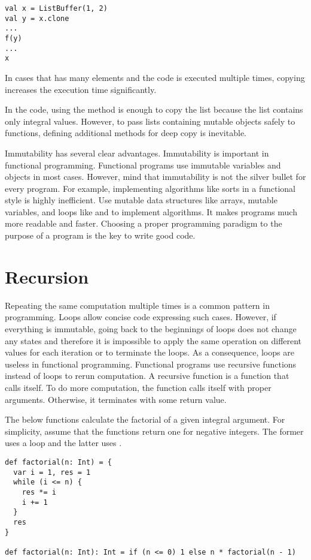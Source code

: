 \begin{verbatim}
val x = ListBuffer(1, 2)
val y = x.clone
...
f(y)
...
x
\end{verbatim}

In cases that  has many elements and the code is executed multiple times,
copying  increases the execution time significantly.

In the code, using the  method is enough to copy the list because the
list contains only integral values. However, to pass lists containing mutable
objects safely to functions, defining additional methods for deep copy is
inevitable.

Immutability has several clear advantages. Immutability is important in
functional programming. Functional programs use immutable variables and objects
in most cases. However, mind that immutability is not the silver bullet for every
program. For example, implementing algorithms like sorts in a functional style is
highly inefficient. Use mutable data structures like arrays, mutable variables,
and loops like  and  to implement algorithms. It makes
programs much more readable and faster. Choosing a proper programming paradigm to
the purpose of a program is the key to write good code.

\section{Recursion}

Repeating the same computation multiple times is a common pattern in programming.
Loops allow concise code expressing such cases. However, if everything is
immutable, going back to the beginnings of loops does not change any states and
therefore it is impossible to apply the same operation on different values for
each iteration or to terminate the loops. As a consequence, loops are useless in
functional programming. Functional programs use recursive functions instead of
loops to rerun computation. A recursive function is a function that calls itself.
To do more computation, the function calls itself with proper arguments.
Otherwise, it terminates with some return value.

The below  functions calculate the factorial of a given integral
argument. For simplicity, assume that the functions return one for negative
integers. The former uses a loop and the latter uses .

\begin{verbatim}
def factorial(n: Int) = {
  var i = 1, res = 1
  while (i <= n) {
    res *= i
    i += 1
  }
  res
}

def factorial(n: Int): Int = if (n <= 0) 1 else n * factorial(n - 1)
\end{verbatim}

